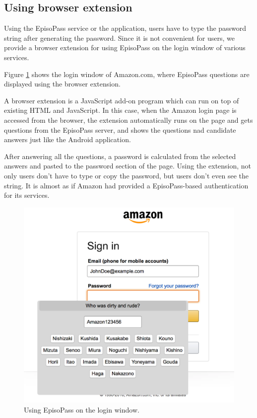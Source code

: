 \documentclass[runningheads,a4paper]{llncs}
\begin{document}

\subsection{Using browser extension}

Using the EpisoPass service or the application,
users have to type the password string after generating the password.
Since it is not convenient for users,
we provide a browser extension for using EpisoPass on the login window of
various services.

Figure \ref{extension} shows the login window of Amazon.com, where
EpisoPass questions are displayed using the browser extension.

A browser extension is a JavaScript add-on program which can
run on top of existing HTML and JavaScript.
In this case, when the Amazon login page is accessed from the browser,
the extension automatically runs on the page and
gets questions from the EpisoPass server, and
shows the questions nad candidate answers just like the Android application.

After answering all the questions, a password is calculated from the
selected answers and pasted to the password section of the page.
Using the extension, not only users don't have to type or copy the password,
but users don't even see the string.
It is almost as if Amazon had provided a EpisoPass-based authentication
for its services.

\begin{figure}[H]
\centering
\includegraphics[width=0.7\columnwidth]{figures/aeff16ffcab956e554364e9e5aca8359}
\caption{Using EpisoPass on the login window.}
\label{extension}
\end{figure}
\end{document}
